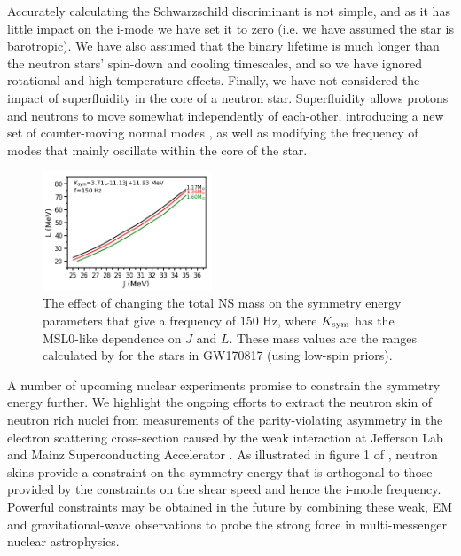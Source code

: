 \documentclass[fleqn,usenatbib]{mnras}
\begin{document}
Accurately calculating the Schwarzschild discriminant is not simple, and as it has little impact on the i-mode we have set it to zero (i.e. we have assumed the star is barotropic). We have also assumed that the binary lifetime is much longer than the neutron stars' spin-down and cooling timescales, and so we have ignored rotational and high temperature effects. Finally, we have not considered the impact of superfluidity in the core of a neutron star. Superfluidity allows protons and neutrons to move somewhat independently of each-other, introducing a new set of counter-moving normal modes \citep{andersson2001dynamics}, as well as modifying the frequency of modes that mainly oscillate within the core of the star.


\begin{figure}
\centering
\includegraphics[width=0.45\textwidth,angle=0]{vary_mass_MSL0.png}
\caption{The effect of changing the total NS mass on the symmetry energy parameters that give a frequency of $150$ Hz, where $K_{\rm sym}$ has the MSL0-like dependence on $J$ and $L$. These mass values are the ranges calculated by \citet{abbott2017gw170817} for the stars in GW170817 (using low-spin priors).}
\label{fig:vary_mass_contours}
\end{figure}


A number of upcoming nuclear experiments promise to constrain the symmetry energy further. We highlight the ongoing efforts to extract the neutron skin of neutron rich nuclei from measurements of the parity-violating asymmetry in the electron scattering cross-section caused by the weak interaction \citep{Abrahamyan:2012aa} at Jefferson Lab and Mainz Superconducting Accelerator \citep{Horowitz:2014aa,Becker:2018aa,Thiel:2019aa}. As illustrated in figure 1 of \citet{steiner2009constraints}, neutron skins provide a constraint on the symmetry energy that is orthogonal to those provided by the constraints on the shear speed and hence the i-mode frequency. Powerful constraints may be obtained in the future by combining these weak, EM and gravitational-wave observations to probe the strong force in multi-messenger nuclear astrophysics.
\end{document}

